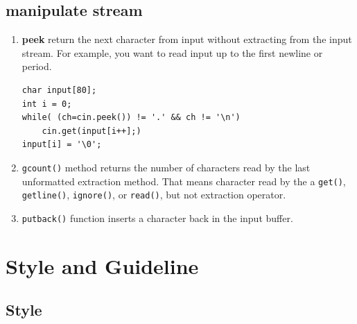 \documentclass[a4paper,11pt,twoside]{book}
\begin{document}
\section{manipulate stream}
\begin{enumerate}
	\item \textbf{peek} return the next character from input without extracting from the input stream. For example, you want to read input up to the first newline or period.
\begin{lstlisting}[numbers=none]
char input[80];
int i = 0;
while( (ch=cin.peek()) != '.' && ch != '\n')
	cin.get(input[i++];)
input[i] = '\0';
\end{lstlisting}
	
	\item \texttt{gcount()} method returns the number of characters read by the last unformatted extraction method. That means character read by the a \texttt{get()}, \texttt{getline()}, \texttt{ignore()}, or \texttt{read()}, but not extraction operator.
	
	\item \texttt{putback()} function inserts a character back in the input buffer.
\end{enumerate}


\chapter{Style and Guideline}


\section{Style}
\end{document}
